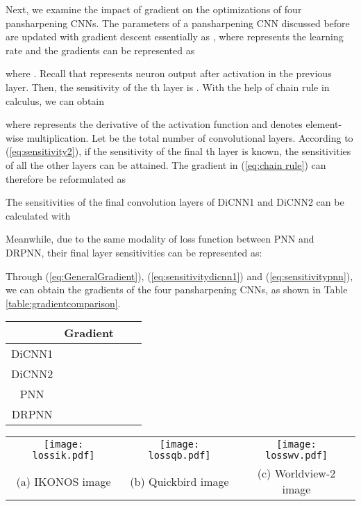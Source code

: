 \documentclass[journal]{IEEEtran}
\begin{document}
Next, we examine the impact of gradient on the optimizations of four pansharpening CNNs. The parameters of a pansharpening CNN discussed before are updated with gradient descent essentially as
,
where  represents the learning rate
and the gradients can be represented as

 where . Recall that  represents neuron output after activation in the previous layer. Then, the sensitivity of the th layer is .
With the help of chain rule in calculus, we can obtain

where  represents the derivative of the activation function and  denotes element-wise multiplication. Let  be the total number of convolutional layers.
According to (\ref{eq:sensitivity2}),  if the sensitivity of the final  th layer is known, the sensitivities of all the other layers can be attained. The gradient in  (\ref{eq:chain rule}) can therefore be reformulated as


The sensitivities of the final convolution layers of DiCNN1 and DiCNN2 can be calculated with

Meanwhile, due to the same modality of loss function between PNN and DRPNN, their final layer sensitivities can be represented as:

Through (\ref{eq:GeneralGradient}), (\ref{eq:sensitivitydicnn1}) and (\ref{eq:sensitivitypnn}), we can obtain the gradients of the four pansharpening CNNs, as shown in Table \ref{table:gradientcomparison}.

\begin{table*}[htb]
\caption{Gradients involved in four pansharpening CNNs}
\centering
\begin{tabular}{c|ccc}
\hline
{}&Gradient&&\\
\hline
DiCNN1&    &&\\
\hline
DiCNN2&  &&\\
\hline
PNN &  &&\\
\hline
DRPNN &  &&\\
\hline
\end{tabular}
\label{table:gradientcomparison}
\end{table*}

\begin{figure*}[htb]\scriptsize
\centering
\begin{tabular}{ccc}
\texttt{[image: lossik.pdf]}&
\texttt{[image: lossqb.pdf]}&
\texttt{[image: losswv.pdf]}\\
(a) IKONOS image & (b) Quickbird image & (c) Worldview-2 image\\
\end{tabular}
\caption{Training losses of DiCNN1, DiCNN2, PNN and DRPNN}
\label{fig:loss}
\end{figure*}
\end{document}
